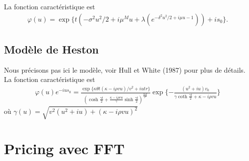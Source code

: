 \documentclass{article}
\begin{document}
La fonction caractéristique est
%
\begin{align*}
	\varphi(u) = \exp\{t(-\sigma^2u^2/2+i\mu^M u + \lambda(e^{-\delta^2u^2/2+i\mu u -1}))+is_0\}.
\end{align*}
%
\subsection{Modèle de Heston}
Nous précisons pas ici le modèle, voir Hull et White (1987) pour plus de détails. La fonction caractéristique est
%
\begin{align*}
	\varphi(u)e^{-ius_0} = \frac{\exp\{\kappa \theta t(\kappa - i \rho v u)/v^2+iut r\}}{(\cosh\frac{\gamma t}{2}+\frac{\kappa-i\rho v u }{\gamma}\sinh\frac{\gamma t }{2})^{\frac{2\kappa \theta}{v^2}}}\exp\{-\frac{(u^2+iu)v_0}{\gamma \coth\frac{\gamma t}{2}+\kappa-i\rho v u}\}
\end{align*}
%
où $\gamma(u) = \sqrt{v^2(u^2+iu)+(\kappa-i\rho v u)^2}$

\section{Pricing avec FFT}
\end{document}
